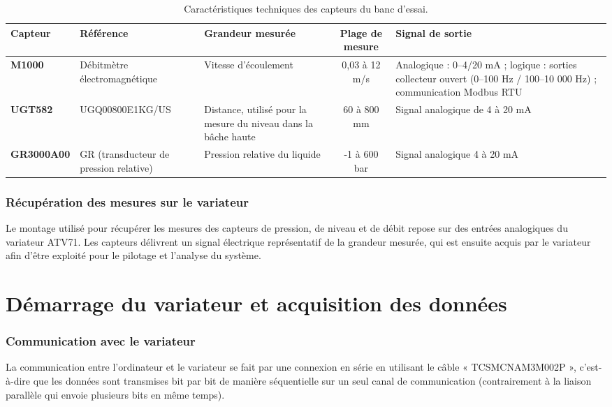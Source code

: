 \documentclass[12pt,a4paper]{article}
\begin{document}
\begin{table}[H]
\centering
\small
\renewcommand{\arraystretch}{1.4}
\begin{tabularx}{\textwidth}{|>{\bfseries}p{2.2cm}|p{3.2cm}|X|c|X|}
\hline
Capteur & Référence & Grandeur mesurée & Plage de mesure & Signal de sortie \\
\hline
M1000 & Débitmètre électromagnétique & Vitesse d'écoulement & 0,03 à 12 m/s & Analogique : 0--4/20 mA ; logique : sorties collecteur ouvert (0--100 Hz / 100--10 000 Hz) ; communication Modbus RTU \\
\hline
UGT582 & UGQ00800E1KG/\allowbreak US & Distance, utilisé pour la mesure du niveau dans la bâche haute & 60 à 800 mm & Signal analogique de 4 à 20 mA \\
\hline
GR3000A00 & GR (transducteur de pression relative) & Pression relative du liquide & -1 à 600 bar & Signal analogique 4 à 20 mA \\
\hline
\end{tabularx}
\caption{Caractéristiques techniques des capteurs du banc d’essai.}
\end{table}

\vspace{5cm}

\section{Récupération des mesures sur le variateur}

Le montage utilisé pour récupérer les mesures des capteurs de pression, de niveau et de débit repose sur des entrées analogiques du variateur ATV71. Les capteurs délivrent un signal électrique représentatif de la grandeur mesurée, qui est ensuite acquis par le variateur afin d’être exploité pour le pilotage et l’analyse du système.

\clearpage

\part{Démarrage du variateur et acquisition des données}

\section{Communication avec le variateur}

La communication entre l’ordinateur et le variateur se fait par une connexion en série en utilisant le câble « TCSMCNAM3M002P », c’est-à-dire que les données sont transmises bit par bit de manière séquentielle sur un seul canal de communication (contrairement à la liaison parallèle qui envoie plusieurs bits en même temps).
\end{document}
